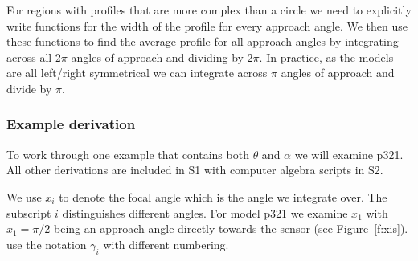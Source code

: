 \documentclass[a4paper,10pt,reqno,oneside]{amsart}
\begin{document}
For regions with profiles that are more complex than a circle we need to explicitly write functions for the width of the profile for every approach angle. We then use these functions to find the average profile for all approach angles by integrating across all $2\pi$ angles of approach and dividing by $2\pi$. In practice, as the models are all left/right symmetrical we can integrate across $\pi$ angles of approach and divide by $\pi$.

\subsubsection{Example derivation}

To work through one example that contains both $\theta$ and $\alpha$ we will examine p321. All other derivations are included in S1 with computer algebra scripts in S2. 

We use $x_i$ to denote the focal angle which is the angle we integrate over. The subscript $i$ distinguishes different angles. For model p321 we examine $x_1$ with  $x_1 = \pi/2$ being an approach angle directly towards the sensor (see Figure~\ref{f:xis}). \cite{rowcliffe2008estimating} use the notation $\gamma_i$ with different numbering.
\end{document}
